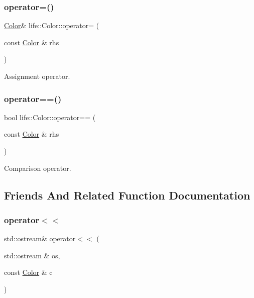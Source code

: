 \subsubsection{\texorpdfstring{operator=()}{operator=()}}
{\footnotesize\ttfamily \mbox{\hyperlink{structlife_1_1_color}{Color}}\& life\+::\+Color\+::operator= (\begin{DoxyParamCaption}\item[{const \mbox{\hyperlink{structlife_1_1_color}{Color}} \&}]{rhs }\end{DoxyParamCaption})\hspace{0.3cm}{\ttfamily [inline]}}



Assignment operator. 

\mbox{\label{structlife_1_1_color_a5c68002aa56cf5932c14ff2f1bf7f24b}} 
\subsubsection{\texorpdfstring{operator==()}{operator==()}}
{\footnotesize\ttfamily bool life\+::\+Color\+::operator== (\begin{DoxyParamCaption}\item[{const \mbox{\hyperlink{structlife_1_1_color}{Color}} \&}]{rhs }\end{DoxyParamCaption})\hspace{0.3cm}{\ttfamily [inline]}}



Comparison operator. 



\subsection{Friends And Related Function Documentation}
\mbox{\label{structlife_1_1_color_afdfe1a75bd9930a51707d642a7a4afcd}} 
\subsubsection{\texorpdfstring{operator$<$$<$}{operator<<}}
{\footnotesize\ttfamily std\+::ostream\& operator$<$$<$ (\begin{DoxyParamCaption}\item[{std\+::ostream \&}]{os,  }\item[{const \mbox{\hyperlink{structlife_1_1_color}{Color}} \&}]{c }\end{DoxyParamCaption})\hspace{0.3cm}{\ttfamily [friend]}}



